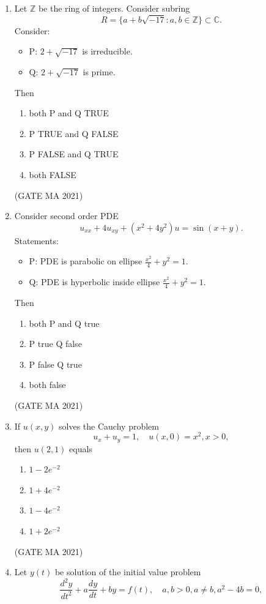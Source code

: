 \documentclass[journal,12pt,onecolumn]{IEEEtran}
\theoremstyle{remark}
\begin{document}
\begin{enumerate}
    \item Let $\mathbb{Z}$ be the ring of integers. Consider subring
    \[
    R = \{a + b \sqrt{-17} : a,b \in \mathbb{Z}\} \subset \mathbb{C}.
    \]
    Consider:
    \begin{itemize}
        \item P: $2 + \sqrt{-17}$ is irreducible.
        \item Q: $2 + \sqrt{-17}$ is prime.
    \end{itemize}
    Then
    \begin{enumerate}
        \item both P and Q TRUE
        \item P TRUE and Q FALSE
        \item P FALSE and Q TRUE
        \item both FALSE
    \end{enumerate}
\hfill(GATE MA 2021)
    \item Consider second order PDE
    \[
    u_{xx} + 4 u_{xy} + (x^2 + 4 y^2) u = \sin(x+y).
    \]
    Statements:
    \begin{itemize}
        \item P: PDE is parabolic on ellipse $\frac{x^2}{4} + y^2 = 1$.
        \item Q: PDE is hyperbolic inside ellipse $\frac{x^2}{4} + y^2 = 1$.
    \end{itemize}
    Then
    \begin{enumerate}
        \item both P and Q true
        \item P true Q false
        \item P false Q true
        \item both false
    \end{enumerate}
    \hfill(GATE MA 2021)
    \item If $u(x,y)$ solves the Cauchy problem
    $$
    u_x + u_y = 1, \quad u(x,0) = x^2, x>0,
    $$
    then $u(2,1)$ equals
    \begin{enumerate}
        \item $1 - 2 e^{-2}$
        \item $1 + 4 e^{-2}$
        \item $1 - 4 e^{-2}$
        \item $1 + 2 e^{-2}$
    \end{enumerate}
\hfill(GATE MA 2021)
    \item Let $y(t)$ be solution of the initial value problem
    $$
    \frac{d^2y}{dt^2}  + a\frac{dy}{dt} + by = f(t), \quad a,b > 0, a \neq b, a^2 - 4b=0,
$$
\end{enumerate}
\end{document}
